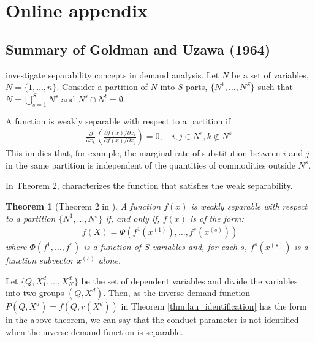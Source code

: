 \documentclass[11pt, a4paper]{article}
\newtheorem{theorem}{Theorem}
\theoremstyle{remark}
\begin{document}
\newpage



\newpage
\appendix

\section{Online appendix}


\subsection{Summary of Goldman and Uzawa (1964)}\label{appendix:summary_goldman_uzawa}

\citet{goldmanNote1964} investigate separability concepts in demand analysis.
Let $N$ be a set of variables, $N = \{1,\ldots, n\}$.
Consider a partition of $N$ into $S$ parts, $\{N^1, \ldots, N^S\}$ such that $N = \bigcup_{s=1}^S N^s$ and $N^s \cap N^t = \emptyset$.

A function is weakly separable with respect to a partition if 
\begin{align}
    \frac{\partial}{\partial x_k}\left(\frac{\partial f(x)/\partial x_i}{\partial f(x)/\partial x_j} \right)= 0, \quad i,j\in N^s, k \notin N^s.
\end{align}
This implies that, for example, the marginal rate of substitution between $i$ and $j$ in the same partition is independent of the quantities of commodities outside $N^s$.

In Theorem 2, \citet{goldmanNote1964} characterizes the function that satisfies the weak separability.
\begin{theorem}[Theorem 2 in \citet{goldmanNote1964}]
    A function $f(x)$ is weakly separable with respect to a partition $\{N^1, .. ., N^s\}$ if, and only if, $f(x)$ is of the form: 
    \begin{align}
        f(X) = \Phi(f^1(x^{(1)}),\ldots, f^s(x^{(s)})   )
    \end{align} where $\Phi(f^1,\ldots, f^s)$ is a function of $S$ variables and, for each $s$, $f^s(x^{(s)})$ is a function subvector $x^{(s)}$ alone.
\end{theorem}

Let $\{Q, X_{1}^{d},\ldots, X_{K}^{d}\}$ be the set of dependent variables and divide the variables into two groups $(Q, X^{d})$.
Then, as the inverse demand function $P(Q, X^{d}) = f(Q, r(X^{d}))$ in Theorem \ref{thm:lau_identification} has the form in the above theorem, we can say that the conduct parameter is not identified when the inverse demand function is separable.
\end{document}
